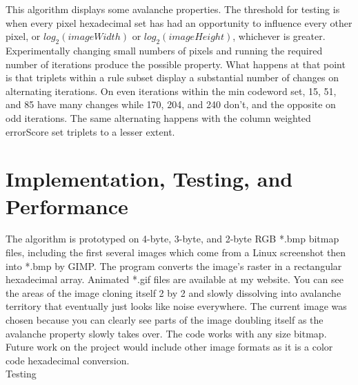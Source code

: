 \documentclass[11pt]{article}
\begin{document}
This algorithm displays some avalanche properties. The threshold for testing is when every pixel hexadecimal set has had an opportunity to influence every other pixel, or $log_2(imageWidth)$ or $log_2(imageHeight)$, whichever is greater. Experimentally changing small numbers of pixels and running the required number of iterations produce the possible property. What happens at that point is that triplets within a rule subset display a substantial number of changes on alternating iterations. On even iterations within the min codeword set, 15, 51, and 85 have many changes while 170, 204, and 240 don't, and the opposite on odd iterations. The same alternating happens with the column weighted errorScore set triplets to a lesser extent.\\

\section{Implementation, Testing, and Performance}

The algorithm is prototyped on 4-byte, 3-byte, and 2-byte RGB *.bmp bitmap files, including the first several images which come from a Linux screenshot then into *.bmp by GIMP. The program converts the image's raster in a rectangular hexadecimal array. Animated *.gif files are available at my website. You can see the areas of the image cloning itself 2 by 2 and slowly dissolving into avalanche territory that eventually just looks like noise everywhere. The current image was chosen because you can clearly see parts of the image doubling itself as the avalanche property slowly takes over. The code works with any size bitmap. Future work on the project would include other image formats as it is a color code hexadecimal conversion. \\

Testing\\
\end{document}
